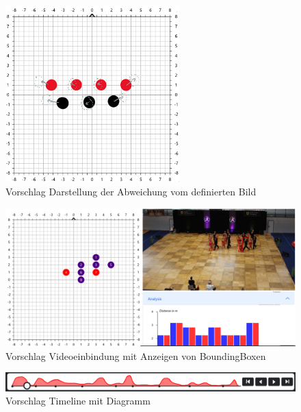\documentclass[
  ngerman,
  a4paper,  %
  twoside,  %
  bibliography=totoc,
  headsepline,
  cleardoublepage=empty,
  parskip=half,
  draft=false
]{scrbook}
\begin{document}
\begin{figure}
  \centering
  \includegraphics[width=0.6\textwidth]{graphics/vorschlag_positionsabweichung_koordinatensystem.png}
  \caption{Vorschlag Darstellung der Abweichung vom definierten Bild}
  \label{fig:tanzfläche}
\end{figure}
\begin{figure}
  \centering
  \includegraphics[width=\textwidth]{graphics/vorschlag_videoeinbindung_mit_bbox.png}
  \caption{Vorschlag Videoeinbindung mit Anzeigen von BoundingBoxen}
  \label{fig:video}
\end{figure}
\begin{figure}
  \centering
  \includegraphics[width=\textwidth]{graphics/vorschlag_timeline.png}
  \caption{Vorschlag Timeline mit Diagramm}
  \label{fig:timeline}
\end{figure}
\end{document}
